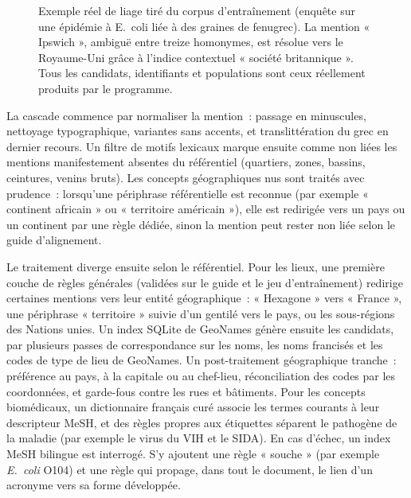 \documentclass[10pt,twoside]{article}
\begin{document}
\begin{figure}[!t]
{%
}
\caption{Exemple réel de liage tiré du corpus d'entraînement (enquête sur une épidémie à E.~coli
liée à des graines de fenugrec). La mention « Ipswich », ambiguë entre treize homonymes, est résolue
vers le Royaume-Uni grâce à l'indice contextuel « société britannique ». Tous les candidats,
identifiants et populations sont ceux réellement produits par le programme.}
\label{fig:pipeline}
\end{figure}

La cascade commence par normaliser la mention~: passage en minuscules, nettoyage typographique,
variantes sans accents, et translittération du grec en dernier recours. Un filtre de motifs lexicaux
marque ensuite comme non liées les mentions manifestement absentes du référentiel (quartiers, zones,
bassins, ceintures, venins bruts). Les concepts
géographiques nus sont traités avec prudence~: lorsqu'une périphrase référentielle est reconnue
(par exemple « continent africain » ou « territoire américain »), elle est redirigée vers un
pays ou un continent par une règle dédiée, sinon la mention peut rester non liée selon le guide
d'alignement.

Le traitement diverge ensuite selon le référentiel. Pour les lieux, une première couche de règles
générales (validées sur le guide et le jeu d'entraînement) redirige certaines mentions vers leur entité
géographique~: « Hexagone » vers « France », une périphrase « territoire » suivie d'un gentilé vers
le pays, ou les sous-régions des Nations unies. Un index SQLite de GeoNames génère ensuite les
candidats, par plusieurs passes de correspondance sur les noms, les noms francisés et les codes de
type de lieu de GeoNames. Un post-traitement géographique tranche~: préférence au pays, à la capitale ou
au chef-lieu, réconciliation des codes par les coordonnées, et garde-fous contre les rues et
bâtiments. Pour les concepts biomédicaux, un dictionnaire français curé associe les termes
courants à leur descripteur MeSH, et des règles propres aux étiquettes séparent le pathogène de la
maladie (par exemple le virus du VIH et le SIDA). En cas d'échec, un index MeSH bilingue est
interrogé. S'y ajoutent une règle « souche » (par exemple \emph{E.~coli} O104) et une règle qui propage, dans
tout le document, le lien d'un acronyme vers sa forme développée.
\end{document}
